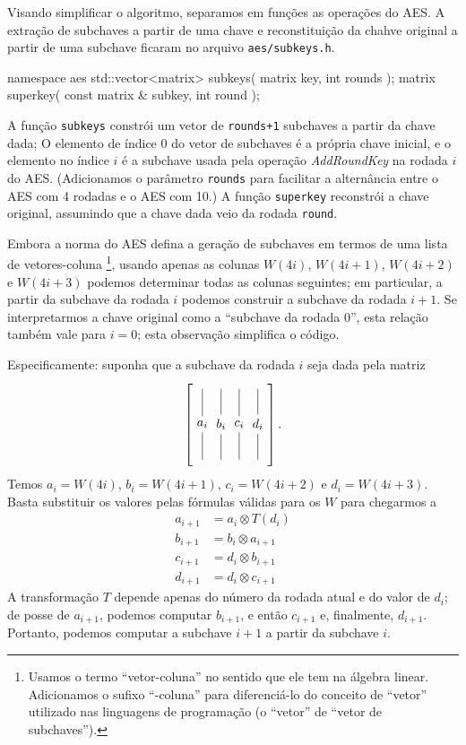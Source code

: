 \documentclass{article}
\newcommand{\xor}{\otimes}
\newcommand{\colvec}[1]{
    \tikz[baseline=-3pt]{
        \node (center) at (0, 0) {$#1$};
        \draw (center) -- (0, 1) (0, 1.2);
        \draw (center) -- (0, -1) (0, -1.2);
    }
}
\begin{document}
Visando simplificar o algoritmo,
separamos em funções as operações do AES.
A extração de subchaves a partir de uma chave
e reconstituição da chahve original a partir de uma subchave
ficaram no arquivo \verb"aes/subkeys.h".

\begin{cppcode}
    namespace aes {
        std::vector<matrix> subkeys( matrix key, int rounds );
        matrix superkey( const matrix & subkey, int round );
    }
\end{cppcode}

A função \verb"subkeys" constrói um vetor de \verb"rounds+1" subchaves
a partir da chave dada;
O elemento de índice $0$ do vetor de subchaves é a própria chave inicial,
e o elemento no índice $i$ é a subchave usada pela operação \emph{AddRoundKey}
na rodada $i$ do AES.
(Adicionamos o parâmetro \verb"rounds" para facilitar a alternância
entre o AES com 4 rodadas e o AES com 10.)
A função \verb"superkey" reconstrói a chave original,
assumindo que a chave dada veio da rodada \verb"round".

Embora a norma do AES defina a geração de subchaves em termos de
uma lista de vetores-coluna%
\footnote{
    Usamos o termo ``vetor-coluna'' no sentido que ele tem na álgebra linear.
    Adicionamos o sufixo ``-coluna'' para diferenciá-lo
    do conceito de ``vetor'' utilizado nas linguagens de programação
    (o ``vetor'' de ``vetor de subchaves'').
},
usando apenas as colunas $W(4i)$, $W(4i+1)$, $W(4i+2)$ e $W(4i+3)$
podemos determinar todas as colunas seguintes;
em particular,
a partir da subchave da rodada $i$
podemos construir a subchave da rodada $i+1$.
Se interpretarmos a chave original como a ``subchave da rodada $0$'',
esta relação também vale para $i = 0$;
esta observação simplifica o código.

Especificamente: suponha que a subchave da rodada $i$
seja dada pela matriz
\begin{equation*}
    \left[ \colvec{a_i} \colvec{b_i} \colvec{c_i} \colvec{d_i} \right].
\end{equation*}
Temos $a_i = W(4i)$, $b_i = W(4i+1)$, $c_i = W(4i+2)$ e $d_i = W(4i+3)$.
Basta substituir os valores pelas fórmulas válidas para os $W$
para chegarmos a
\begin{align*}
    a_{i+1} &= a_i \xor T(d_i) \\
    b_{i+1} &= b_i \xor a_{i+1} \\
    c_{i+1} &= d_i \xor b_{i+1} \\
    d_{i+1} &= d_i \xor c_{i+1}
\end{align*}
A transformação $T$ depende apenas do número da rodada atual e do valor de $d_i$;
de posse de $a_{i+1}$, podemos computar $b_{i+1}$,
e então $c_{i+1}$
e, finalmente, $d_{i+1}$.
Portanto, podemos computar a subchave $i+1$ a partir da subchave $i$.
\end{document}
